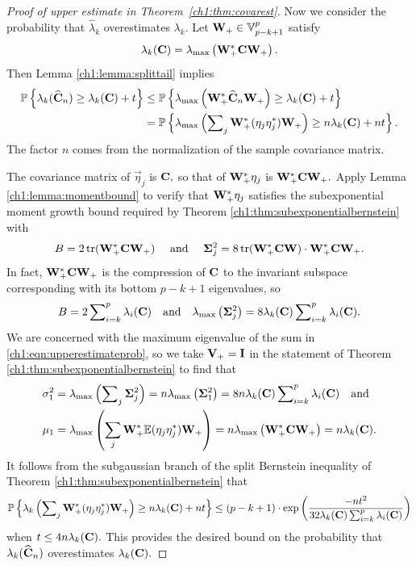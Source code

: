 \begin{proof}[Proof of upper estimate in Theorem~\ref{ch1:thm:covarest}]
Now we consider the probability that $\hat{\lambda}_k$ overestimates
$\lambda_k$. Let $\mathbf{W}_+ \in \mathbb{V}_{p-k+1}^{p}$ satisfy
\[
 \lambda_k(\mathbf{C}) = \lambda_{\mathrm{max}}\left(\mathbf{W}_+^* \mathbf{C} \mathbf{W}_+\right).
\]
Then Lemma \ref{ch1:lemma:splittail} implies
\begin{align}
 \mathbb{P}\left\{\lambda_k(\widehat{\mathbf{C}}_n) \geq \lambda_k(\mathbf{C}) + t\right\} & \leq
\mathbb{P}\left\{\lambda_{\mathrm{max}}\left(\mathbf{W}_+^* \widehat{\mathbf{C}}_n \mathbf{W}_+\right) \geq
\lambda_k(\mathbf{C}) + t\right\} \notag \\
& = \mathbb{P}\left\{\lambda_{\mathrm{max}}\left(\sum\nolimits_j \mathbf{W}_+^* (\mathbf{\eta}_j
\mathbf{\eta}_j^*) \mathbf{W}_+\right) \geq n \lambda_k(\mathbf{C}) + n t\right\}.
\label{ch1:eqn:upperestimateprob}
\end{align}
The factor $n$ comes from the normalization of the sample covariance matrix.

The covariance matrix of $\vec{\eta}_j$ is $\mathbf{C},$ so that of
$\mathbf{W}_+^* \mathbf{\eta}_j$ is $\mathbf{W}_+^*\mathbf{C}\mathbf{W}_+.$ Apply Lemma
\ref{ch1:lemma:momentbound} to verify that $\mathbf{W}_+^* \mathbf{\eta}_j$ satisfies
the subexponential moment growth bound required by Theorem
\ref{ch1:thm:subexponentialbernstein} with 
\[
 B = 2 \operatorname{tr}(\mathbf{W}_+^*\mathbf{C}\mathbf{W}_+) \quad\text{ and }\quad \mathbf{\Sigma}_j^2
= 8\operatorname{tr}(\mathbf{W}_+^*\mathbf{C}\mathbf{W})\cdot \mathbf{W}_+^*\mathbf{C}\mathbf{W}_+.
\]
In fact, $\mathbf{W}_+^*\mathbf{C}\mathbf{W}_+$ is the compression of $\mathbf{C}$ to the
invariant subspace corresponding with its bottom $p-k+1$ eigenvalues, so 
\[
B = 2 \sum\nolimits_{i=k}^p \lambda_i(\mathbf{C}) \quad\text{and}\quad
\lambda_{\mathrm{max}}\left(\mathbf{\Sigma}_j^2\right) = 8 \lambda_k(\mathbf{C}) \sum\nolimits_{i=k}^p
\lambda_i(\mathbf{C}).
\]
We are concerned with the maximum eigenvalue of the sum in
\eqref{ch1:eqn:upperestimateprob}, so we take $\mathbf{V}_+ = \mathbf{I}$ in the
statement of Theorem \ref{ch1:thm:subexponentialbernstein} to find that
\begin{align*}
 \sigma_1^2 & = \lambda_{\mathrm{max}}\left(\sum\nolimits_j \mathbf{\Sigma}_j^2 \right) = n
\lambda_{\mathrm{max}}\left(\mathbf{\Sigma}_1^2\right) = 8 n \lambda_k(\mathbf{C}) \sum\nolimits_{i=k}^p
\lambda_i(\mathbf{C}) \quad \text{and}
\\ \mu_1 & = \lambda_{\mathrm{max}}\left(\sum_j \mathbf{W}_+^*
\mathbb{E}(\mathbf{\eta}_j\mathbf{\eta}_j^*) \mathbf{W}_+ \right) = n\lambda_{\mathrm{max}}\left(\mathbf{W}_+^*
\mathbf{C} \mathbf{W}_+\right) = n \lambda_k(\mathbf{C}).
\end{align*}
It follows from the subgaussian branch of the split Bernstein inequality of
Theorem \ref{ch1:thm:subexponentialbernstein} that 
$$
\mathbb{P}\left\{\lambda_k \left(\sum\nolimits_j \mathbf{W}_+^* (\mathbf{\eta}_j
\mathbf{\eta}_j^*) \mathbf{W}_+ \right) \geq n \lambda_k(\mathbf{C}) + n t\right\} \leq 
 (p-k+1) \cdot \mathrm{exp}\left( \displaystyle \frac{-nt^2}{32 \lambda_k(\mathbf{C})
\sum_{i=k}^p \lambda_i(\mathbf{C})} \right)
$$
when $t \leq 4 n \lambda_k(\mathbf{C}).$ This provides the desired bound on the
probability that $\lambda_k(\widehat{\mathbf{C}}_n)$ overestimates
$\lambda_k(\mathbf{C}).$
\end{proof}


